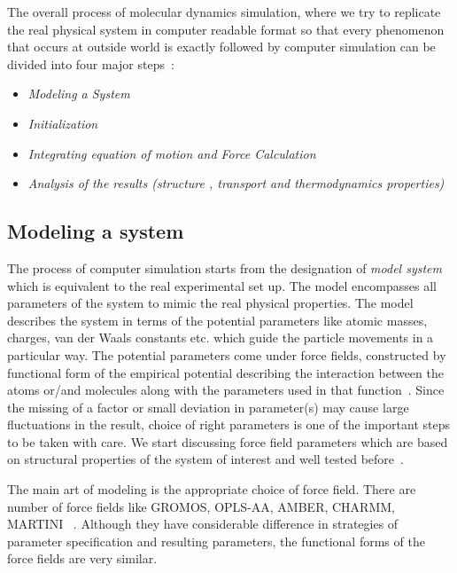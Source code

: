The overall process of molecular dynamics simulation, where we try to replicate the real physical system in computer readable format so that every phenomenon that occurs at outside world is exactly followed by computer simulation can be divided into four major steps~\citep{Gromacs-manual}:
\begin{itemize}
\item \emph{Modeling a System}
\item \emph{Initialization}
\item \emph{Integrating equation of motion and Force Calculation}
\item \emph {Analysis of the results (structure , transport and thermodynamics properties)}
\end{itemize}
\subsection{Modeling a system}
The process of computer simulation starts from the designation of {\it model system} which is equivalent to the real experimental set up. The model encompasses all parameters of the system to mimic the real physical properties. The model describes the system in terms of the potential parameters like atomic masses, charges, van der Waals constants  etc.  which guide the particle movements in a particular way. The potential parameters come under force fields, constructed by functional form of the empirical potential describing the interaction between the atoms or/and molecules along with the parameters used in that function~\citep{ermer1976calculation}. Since the missing of a factor or small deviation in parameter(s) may cause large fluctuations in the result, choice of right parameters is one of the important steps to be taken with care. We start discussing force field parameters which are based on structural properties of the system of interest and well tested before~\citep{Gromacs-manual}. 

The main art of modeling is the appropriate choice of force field. There are number of force fields like GROMOS, OPLS-AA, AMBER, CHARMM, MARTINI ~\citep{van1996biomolecular, kaminski2001evaluation, sorin2005exploring, mackerell2002charmm, marrink2007martini}. Although they have considerable difference in strategies of parameter specification and resulting parameters, the functional forms of the force fields are very similar.

